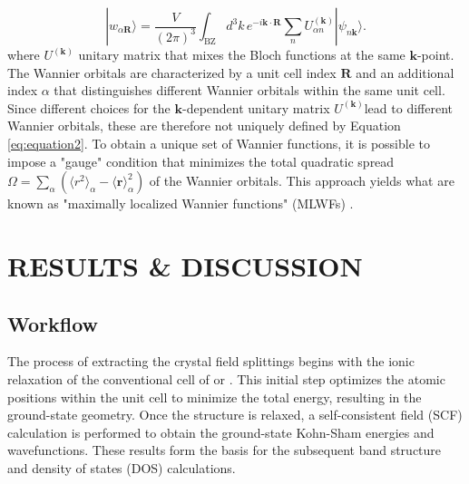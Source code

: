\documentclass[%
 reprint,
 amsmath,amssymb,
 aps,
]{revtex4-2}
\begin{document}
\begin{equation}
    |w_{\alpha \mathbf{R}}\rangle = \frac{V}{(2\pi)^3} \int_{\text{BZ}} d^3k \, e^{-i \mathbf{k} \cdot \mathbf{R}} \sum_{n} U^{(\mathbf{k})}_{\alpha n} |\psi_{n\mathbf{k}}\rangle.
\label{eq:equation2}
\end{equation}
where \(U^{(\mathbf{k})} \) unitary matrix that mixes the Bloch functions at the same \(\mathbf{k}\)-point. The Wannier orbitals are characterized by a unit cell index \(\mathbf{R}\) and an additional index \(\alpha\) that distinguishes different Wannier orbitals within the same unit cell. Since different choices for the \(\mathbf{k}\)-dependent unitary matrix \( U^{(\mathbf{k})} \)lead to different Wannier orbitals, these are therefore not uniquely defined by Equation \ref{eq:equation2}.
To obtain a unique set of Wannier functions, it is possible to impose a "gauge" condition that minimizes the total quadratic spread \( \Omega = \sum_{\alpha} \left( \langle r^2 \rangle_\alpha - \langle \mathbf{r} \rangle_\alpha^2 \right) \) of the Wannier orbitals. This approach yields what are known as "maximally localized Wannier functions" (MLWFs) \cite{Marzari1997}.


\section{RESULTS \& DISCUSSION}
\subsection{Workflow}

The process of extracting the crystal field splittings begins with the ionic relaxation of the conventional cell of  or . This initial step optimizes the atomic positions within the unit cell to minimize the total energy, resulting in the ground-state geometry. Once the structure is relaxed, a self-consistent field (SCF) calculation is performed to obtain the ground-state Kohn-Sham energies and wavefunctions. These results form the basis for the subsequent band structure and density of states (DOS) calculations.
\end{document}
